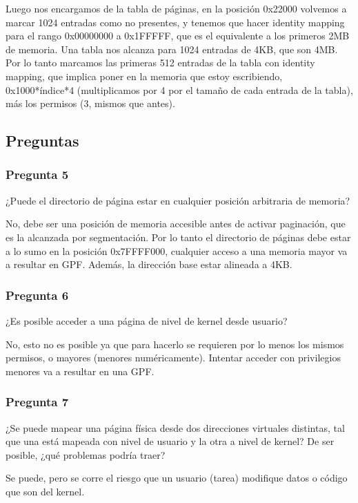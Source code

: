 \documentclass[10pt, a4paper]{article}
\begin{document}
Luego nos encargamos de la tabla de páginas, en la posición 0x22000 volvemos a marcar 1024 entradas como no presentes, y tenemos que hacer identity mapping para el rango 0x00000000 a 0x1FFFFF, que es el equivalente a los primeros 2MB de memoria. Una tabla nos alcanza para 1024 entradas de 4KB, que son 4MB. Por lo tanto marcamos las primeras 512 entradas de la tabla con identity mapping, que implica poner en la memoria que estoy escribiendo, 0x1000*índice*4 (multiplicamos por 4 por el tamaño de cada entrada de la tabla), más los permisos (3, mismos que antes).

\subsection{Preguntas}
\subsubsection*{Pregunta 5}
 \begin{framed}
¿Puede el directorio de página estar en cualquier posición arbitraria de memoria?
\end{framed}
No, debe ser una posición de memoria accesible antes de activar paginación, que es la alcanzada por segmentación. Por lo tanto el directorio de páginas debe estar a lo sumo en la posición 0x7FFFF000, cualquier acceso a una memoria mayor va a resultar en GPF. Además, la dirección base estar alineada a 4KB.
\subsubsection*{Pregunta 6}
 \begin{framed}
¿Es posible acceder a una página de nivel de kernel desde usuario?
\end{framed}
No, esto no es posible ya que para hacerlo se requieren por lo menos los mismos permisos, o mayores (menores numéricamente). Intentar acceder con privilegios menores va a resultar en una GPF.
\subsubsection*{Pregunta 7}
 \begin{framed}
¿Se puede mapear una página física desde dos direcciones virtuales distintas, tal que una está mapeada con nivel de usuario y la otra a nivel de kernel?
De ser posible, ¿qué problemas podría traer?
\end{framed}
Se puede, pero se corre el riesgo que un usuario (tarea) modifique datos o código que son del kernel.
\end{document}
